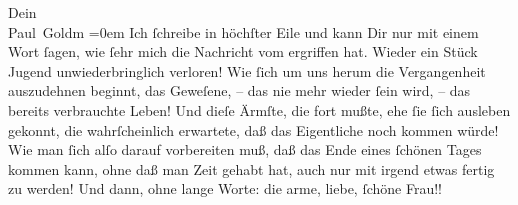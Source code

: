 \begin{ledgroupsized}[t]{13cm}
           \pstart
           Dein {\\[\baselineskip]}\spacefill\mbox{Paul Goldm}\pend
           \leftskip=0em{}\pstart
           \noindent{}Ich ſchreibe in höchſter Eile und kann Dir nur mit einem {\pb}Wort ſagen, wie ſehr mich die Nachricht vom
                     \label{K_L02831-5v}\label{K_L02831-5h} ergriffen hat. Wieder ein Stück Jugend unwiederbringlich verloren!
                  Wie ſich um uns  herum die Vergangenheit
                  auszudehnen beginnt, das Geweſene, – das nie mehr wieder ſein wird, – das bereits
                  verbrauchte Leben! Und dieſe Ärmſte, die fort mußte, ehe ſie ſich ausleben gekonnt, die wahrſcheinlich
                  erwartete, daß das Eigentliche noch kommen würde! Wie man ſich alſo darauf
                  vorbereiten muß, daß das Ende eines {\pb}ſchönen
                  Tages kommen kann, ohne daß man Zeit gehabt hat, auch nur mit irgend etwas fertig
                  zu werden! Und dann, ohne lange Worte: die arme, liebe, ſchöne Frau!!\pend
           
         
         \endnumbering{}\end{ledgroupsized}  \newcommand{\dateiname}{L02831}\newcommand{\titel}{Paul Goldmann an Arthur Schnitzler, 19. 11. [1897]}\newcommand{\editorInnen}{Martin Anton Müller und Laura Untner}
      